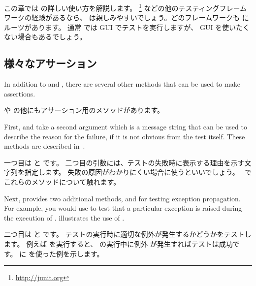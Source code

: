 \documentclass[a4paper,10pt,twoside]{book}
\begin{document}
この章では \SUnit の詳しい使い方を解説します。
\JUnit\footnote{\url{http://junit.org}} などの他のテスティングフレームワークの経験があるなら、 \SUnit は親しみやすいでしょう。どのフレームワークも \SUnit にルーツがあります。
通常 \SUnit では GUI でテストを実行しますが、 GUI を使いたくない場合もあるでしょう。

\subsection{様々なアサーション}

In addition to  and , there are several other methods that can be used to make assertions.
\fi

 や  の他にもアサーション用のメソッドがあります。

First,  and  take a second argument which is a message string that can be used to describe the reason for the failure, if it is not obvious from the test itself.   These methods are described in~.
\fi

一つ目は  と  です。
二つ目の引数には、テストの失敗時に表示する理由を示す文字列を指定します。
失敗の原因がわかりにくい場合に使うといいでしょう。
~でこれらのメソッドについて触れます。

Next, \sunit provides two additional methods,  and
 for testing exception propagation.
For example, you would use 
 to test that a particular exception is raised during the execution of .  
illustrates the use of \mbox{.}
\fi

二つ目は  と  です。
テストの実行時に適切な例外が発生するかどうかをテストします。
例えば  を実行すると、  の実行中に例外  が発生すればテストは成功です。
 に \mbox{} を使った例を示します。
\end{document}
